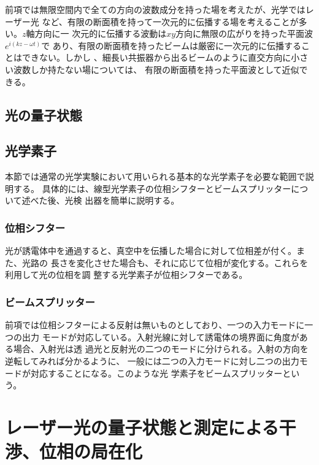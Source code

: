 \documentclass[10pt]{jsarticle}
\begin{document}
前項では無限空間内で全ての方向の波数成分を持った場を考えたが、光学ではレーザー光
など、有限の断面積を持って一次元的に伝播する場を考えることが多い。$z$軸方向に一
次元的に伝播する波動は$xy$方向に無限の広がりを持った平面波$e^{i(kz-\omega t)}$で
あり、有限の断面積を持ったビームは厳密に一次元的に伝播することはできない。しかし
、細長い共振器から出るビームのように直交方向に小さい波数しか持たない場については、
有限の断面積を持った平面波として近似できる。

\subsection{光の量子状態}
\label{sec:state}


\subsection{光学素子}
\label{sec:device}

本節では通常の光学実験において用いられる基本的な光学素子を必要な範囲で説明する。
具体的には、線型光学素子の位相シフターとビームスプリッターについて述べた後、光検
出器を簡単に説明する\cite{Leonhardt,Vogel}。

\subsubsection*{位相シフター}

光が誘電体中を通過すると、真空中を伝播した場合に対して位相差が付く。また、光路の
長さを変化させた場合も、それに応じて位相が変化する。これらを利用して光の位相を調
整する光学素子が位相シフターである。

\subsubsection*{ビームスプリッター}

前項では位相シフターによる反射は無いものとしており、一つの入力モードに一つの出力
モードが対応している。入射光線に対して誘電体の境界面に角度がある場合、入射光は透
過光と反射光の二つのモードに分けられる。入射の方向を逆転してみれば分かるように、
一般には二つの入力モードに対し二つの出力モードが対応することになる。このような光
学素子をビームスプリッターという。

\section{レーザー光の量子状態と測定による干渉、位相の局在化}
\label{chap:localization}
\end{document}
